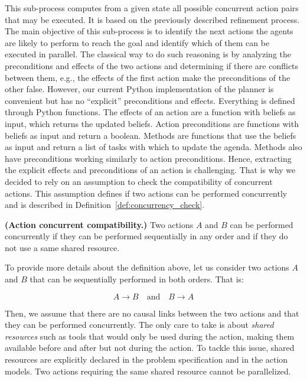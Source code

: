 This sub-process computes from a given state all possible concurrent action pairs that may be executed. It is based on the previously described refinement process. The main objective of this sub-process is to identify the next actions the agents are likely to perform to reach the goal and identify which of them can be executed in parallel. The classical way to do such reasoning is by analyzing the preconditions and effects of the two actions and determining if there are conflicts between them, e.g., the effects of the first action make the preconditions of the other false.
However, our current Python implementation of the planner is convenient but has no ``explicit'' preconditions and effects. Everything is defined through Python functions. The effects of an action are a function with beliefs as input, which returns the updated beliefs. Action preconditions are functions with beliefs as input and return a boolean. Methods are functions that use the beliefs as input and return a list of tasks with which to update the agenda. Methods also have preconditions working similarly to action preconditions. 
Hence, extracting the explicit effects and preconditions of an action is challenging. That is why we decided to rely on an assumption to check the compatibility of concurrent actions. This assumption defines if two actions can be performed concurrently and is described in Definition~\ref{def:concurrency_check}.

\begin{definition}
    \textbf{(Action concurrent compatibility.)} Two actions $A$ and $ B$ can be performed concurrently if they can be performed sequentially in any order and if they do not use a same shared resource.
    \label{def:concurrency_check}
\end{definition}

To provide more details about the definition above, let us consider two actions $A$ and $B$ that can be sequentially performed in both orders. That is:

\begin{equation*}
    A \rightarrow B \quad \text{and} \quad B \rightarrow A
\end{equation*}

Then, we assume that there are no causal links between the two actions and that they can be performed concurrently. The only care to take is about \textit{shared resources} such as tools that would only be used during the action, making them available before and after but not during the action. To tackle this issue, shared resources are explicitly declared in the problem specification and in the action models. Two actions requiring the same shared resource cannot be parallelized.

